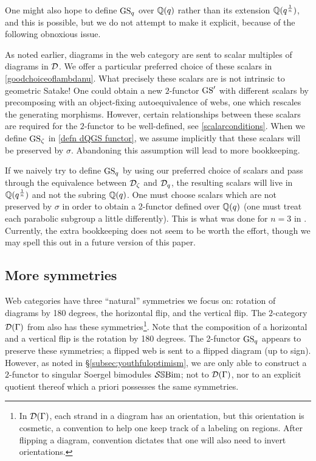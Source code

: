 One might also hope to define $\operatorname{GS}_q$ over $\mathbb{Q}(q)$ rather than its extension $\mathbb{Q}(q^{\frac{1}{n}})$, and this is possible, but we do not attempt to make it explicit, because of the following obnoxious issue.

As noted earlier, diagrams in the web category are sent to scalar multiples of diagrams in $\mathcal{D}$. We offer a particular preferred choice of these scalars in \cref{goodchoiceoflambdanu}. What precisely these scalars are is not intrinsic to geometric Satake! One could obtain a new $2$-functor $\operatorname{GS}'$ with different scalars by precomposing with an object-fixing autoequivalence of webs, one which rescales the generating morphisms. However, certain relationships between these scalars are required for the $2$-functor to be well-defined, see \eqref{scalarconditions}. When we define $\operatorname{GS}_{\zeta}$ in \cref{defn dQGS functor}, we assume implicitly that these scalars will be preserved by $\sigma$. Abandoning this assumption will lead to more bookkeeping.

If we naively try to define $\operatorname{GS}_q$ by using our preferred choice of scalars and pass through the equivalence between $\mathcal{D}_{\zeta}$ and $\mathcal{D}_q$, the resulting scalars will live in $\mathbb{Q}(q^{\frac{1}{n}})$ and not the subring $\mathbb{Q}(q)$. One must choose scalars which are not preserved by $\sigma$ in order to obtain a 2-functor defined over $\mathbb{Q}(q)$ (one must treat each parabolic subgroup a little differently). This is what was done for $n=3$ in \cite{EQuantumI}. Currently, the extra bookkeeping does not seem to be worth the effort, though we may spell this out in a future version of this paper.

\subsection{More symmetries} 


Web categories have three ``natural'' symmetries we focus on: rotation of diagrams by 180 degrees, the horizontal flip, and the vertical flip. The $2$-category $\mathcal{D}(\Gamma)$ from \cite{EWSFrob} also has these symmetries\footnote{In $\mathcal{D}(\Gamma)$, each strand in a diagram has an orientation, but this orientation is cosmetic, a convention to help one keep track of a labeling on regions. After flipping a diagram, convention dictates that one will also need to invert orientations.}. Note that the composition of a horizontal and a vertical flip is the rotation by 180 degrees. The 2-functor $\operatorname{GS}_q$ appears to preserve these symmetries; a flipped web is sent to a flipped diagram (up to sign). However, as noted in \S\ref{subsec:youthfuloptimism}, we are only able to construct a $2$-functor to singular Soergel bimodules $\mathcal{S}\mathbb{S}\text{Bim}$; not to $\mathcal{D}(\Gamma)$, nor to an explicit quotient thereof which a priori possesses the same symmetries.

